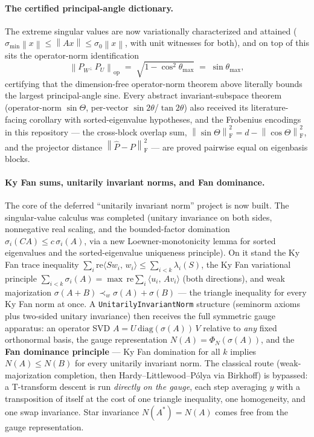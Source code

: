 \documentclass[11pt]{article}
\newcommand{\norm}[1]{\left\lVert #1\right\rVert}
\newcommand{\F}{\mathrm{F}}
\newcommand{\op}{\mathrm{op}}
\newcommand{\inner}[2]{\langle #1,\,#2\rangle}
\newcommand{\sinT}{\sin\Theta}
\theoremstyle{remark}
\begin{document}
\paragraph{The certified principal-angle dictionary.}
The extreme singular values are now variationally characterized and attained
($\sigma_{\min}\norm{x}\le\norm{Ax}\le\sigma_0\norm{x}$, with unit witnesses
for both), and on top of this sits the operator-norm identification
\[
  \norm{P_{W^{\perp}}\,P_U}_{\op}\;=\;\sqrt{1-\cos^2\theta_{\max}}
  \;=\;\sin\theta_{\max},
\]
certifying that the dimension-free operator-norm theorem above literally
bounds the largest principal-angle sine.  Every abstract invariant-subspace
theorem (operator-norm $\sin\Theta$, per-vector $\sin2\theta$/$\tan2\theta$)
also received its literature-facing corollary with sorted-eigenvalue
hypotheses, and the Frobenius encodings in this repository --- the cross-block
overlap sum, $\norm{\sinT}_{\F}^2=d-\norm{\cos\Theta}_{\F}^2$, and the
projector distance $\norm{\widehat P-P}_{\F}^2$ --- are proved pairwise equal
on eigenbasis blocks.

\paragraph{Ky Fan sums, unitarily invariant norms, and Fan dominance.}
The core of the deferred ``unitarily invariant norm'' project is now built.
The singular-value calculus was completed (unitary invariance on both sides,
nonnegative real scaling, and the bounded-factor domination
$\sigma_i(CA)\le c\,\sigma_i(A)$, via a new Loewner-monotonicity lemma for
sorted eigenvalues and the sorted-eigenvalue uniqueness principle).  On it
stand the Ky Fan trace inequality
$\sum_i\mathrm{re}\inner{Sw_i}{w_i}\le\sum_{i<k}\lambda_i(S)$, the Ky Fan
variational principle
$\sum_{i<k}\sigma_i(A)=\max\,\mathrm{re}\sum_i\inner{u_i}{Av_i}$ (both
directions), and weak majorization
$\sigma(A+B)\prec_w\sigma(A)+\sigma(B)$ --- the triangle inequality for every
Ky Fan norm at once.  A \texttt{UnitarilyInvariantNorm} structure (seminorm
axioms plus two-sided unitary invariance) then receives the full symmetric
gauge apparatus: an operator SVD $A=U\,\mathrm{diag}(\sigma(A))\,V$ relative
to \emph{any} fixed orthonormal basis, the gauge representation
$N(A)=\Phi_N(\sigma(A))$, and the \textbf{Fan dominance principle} --- Ky Fan
domination for all $k$ implies $N(A)\le N(B)$ for every unitarily invariant
norm.  The classical route (weak-majorization completion, then
Hardy--Littlewood--P\'olya via Birkhoff) is bypassed: a T-transform descent is
run \emph{directly on the gauge}, each step averaging $y$ with a transposition
of itself at the cost of one triangle inequality, one homogeneity, and one
swap invariance.  Star invariance $N(A^{*})=N(A)$ comes free from the gauge
representation.
\end{document}
